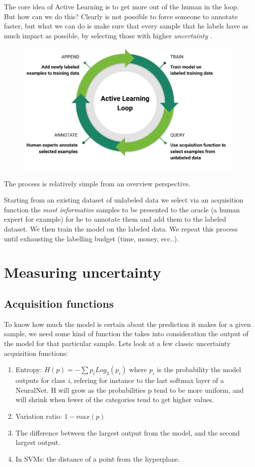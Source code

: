 \documentclass{article}
\begin{document}
\begin{flushleft}
The core idea of Active Learning is to get more out of the human in the loop.
But how can we do this?
Clearly is not possible to force someone to annotate faster, but what we can do is make sure 
that every sample that he labels have as much impact as possible, by selecting those with higher \emph{uncertainty} .


\begin{figure}[h]
    \centering
    \includegraphics[scale=0.5]{AL-loop}
\end{figure}

The process is relatively simple from an overview perspective.

Starting from an existing dataset of unlabeled data we select via an acquisition 
function the \emph{most informative} samples to be presented to the oracle (a human expert for example) 
for he to annotate them and add them to the labeled dataset. We then train the model on the labeled data. 
We repeat this process until exhausting the labelling budget (time, money, ecc..).
\section{Measuring uncertainty}
\label{sec:entropy}
\subsection{Acquisition functions}
To know how much the model is certain about the prediction it makes for a given sample, 
we need some kind of function the takes into consideration the output of the model for that particular sample.
Lets look at a few classic uncertainty acquisition functions:
\begin{enumerate}
    \item Entropy: $H(p) = - \sum{p_iLog_2(p_i)}$ where $p_i$ is the probability the model outputs for class \emph{i}, 
    refering for instance to the last softmax layer of a NeuralNet.
    H will grow as the probabilities p tend to be more uniform, and will shrink when fewer of the categories tend to get higher values.
    \item Variation ratio: $1 - max(p)$
    \item The difference between the largest output from the model, and the second largest output.
    \item In SVMs: the distance of a point from the hyperplane.
\end{enumerate}

\end{flushleft}
\end{document}
